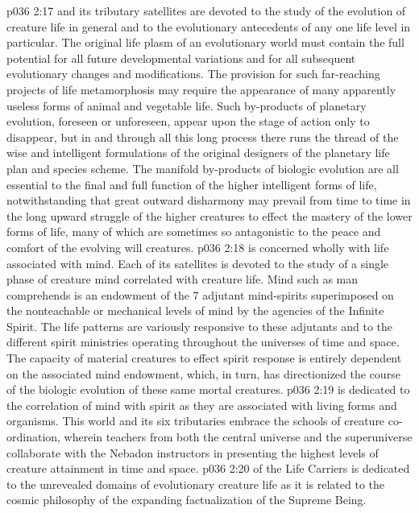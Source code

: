 \vs p036 2:17 \pc {} and its tributary satellites are devoted to the study of the evolution of creature life in general and to the evolutionary antecedents of any one life level in particular. The original life plasm of an evolutionary world must contain the full potential for all future developmental variations and for all subsequent evolutionary changes and modifications. The provision for such far\hyp{}reaching projects of life metamorphosis may require the appearance of many apparently useless forms of animal and vegetable life. Such by\hyp{}products of planetary evolution, foreseen or unforeseen, appear upon the stage of action only to disappear, but in and through all this long process there runs the thread of the wise and intelligent formulations of the original designers of the planetary life plan and species scheme. The manifold by\hyp{}products of biologic evolution are all essential to the final and full function of the higher intelligent forms of life, notwithstanding that great outward disharmony may prevail from time to time in the long upward struggle of the higher creatures to effect the mastery of the lower forms of life, many of which are sometimes so antagonistic to the peace and comfort of the evolving will creatures.
\vs p036 2:18 \pc {} is concerned wholly with life associated with mind. Each of its satellites is devoted to the study of a single phase of creature mind correlated with creature life. Mind such as man comprehends is an endowment of the 7 adjutant mind\hyp{}spirits superimposed on the nonteachable or mechanical levels of mind by the agencies of the Infinite Spirit. The life patterns are variously responsive to these adjutants and to the different spirit ministries operating throughout the universes of time and space. The capacity of material creatures to effect spirit response is entirely dependent on the associated mind endowment, which, in turn, has directionized the course of the biologic evolution of these same mortal creatures.
\vs p036 2:19 \pc {} is dedicated to the correlation of mind with spirit as they are associated with living forms and organisms. This world and its six tributaries embrace the schools of creature co\hyp{}ordination, wherein teachers from both the central universe and the superuniverse collaborate with the Nebadon instructors in presenting the highest levels of creature attainment in time and space.
\vs p036 2:20 \pc {} of the Life Carriers is dedicated to the unrevealed domains of evolutionary creature life as it is related to the cosmic philosophy of the expanding factualization of the Supreme Being.

